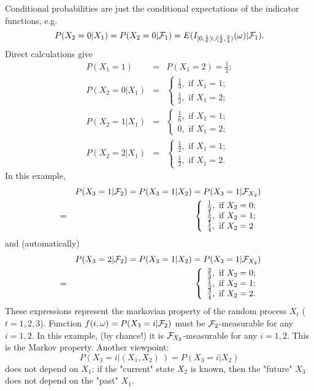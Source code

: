 \documentclass[a4paper,10pt]{article}
\newcommand{\1}[1]{\mathbf{1}_{\{#1\}}}
\begin{document}
Conditional probabilities are just the conditional expectations of the indicator functions, e.g.
$$P(X_2=0|X_1)=P(X_2=0|{\cal F}_1)= E(I_{[0,\frac{1}{6})\cup[\frac{1}{2},\frac{3}{4})}(\omega)|{\cal F}_1).$$
Direct calculations give
\begin{eqnarray*}
P(X_1=1)&=&P(X_1=2)=\frac{1}{2};\\
P(X_2=0|X_1)&=&\left\{\begin{array}{ll} \frac{1}{3}, \mbox{ if } X_1=1; \\ \frac{1}{2}, \mbox{ if } X_1=2; \end{array}\right. \\
P(X_2=1|X_1)&=&\left\{\begin{array}{ll} \frac{1}{6}, \mbox{ if } X_1=1; \\ 0, \mbox{ if } X_1=2; \end{array}\right. \\
P(X_2=2|X_1)&=&\left\{\begin{array}{ll} \frac{1}{2}, \mbox{ if } X_1=1; \\ \frac{1}{2}, \mbox{ if } X_1=2. \end{array}\right.
\end{eqnarray*}
In this example,
\begin{eqnarray*}
&&P(X_3=1|{\cal F}_2)=P(X_3=1|X_2)=P(X_3=1|{\cal F}_{X_2})\\
&=&\left\{\begin{array}{ll} \frac{1}{3}, \mbox{ if } X_2=0; \\ \frac{1}{2}, \mbox{ if } X_2=1; \\ \frac{1}{4}, \mbox{ if } X_2=2 \end{array}\right.
\end{eqnarray*}
and (automatically)
\begin{eqnarray*}
&&P(X_3=2|{\cal F}_2)=P(X_3=1|X_2)=P(X_3=1|{\cal F}_{X_2})\\
&=&\left\{\begin{array}{ll} \frac{2}{3}, \mbox{ if } X_2=0; \\ \frac{1}{2}, \mbox{ if } X_2=1; \\ \frac{3}{4}, \mbox{ if } X_2=2. \end{array}\right.
\end{eqnarray*}
These expressions represent the markovian property of the random process $X_t$ ($t=1,2,3$). Function $f(i,\omega)=P(X_3=i|{\cal F}_2)$ must be ${\cal F}_2$-measurable for any $i=1,2$. In this example, (by chance!) it is ${\cal F}_{X_2}$-measurable for any $i=1,2$. This is the Markov property. Another viewpoint:
$$P(X_3=i|(X_1,X_2)~)=P(X_3=i|X_2)$$
does not depend on $X_1$: if the "current" state $X_2$ is known, then the "future" $X_3$ does not depend on the "past" $X_1$.
\end{document}
